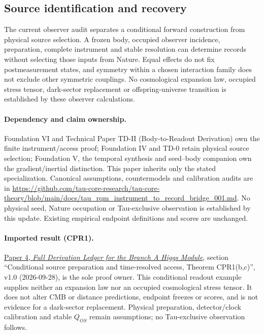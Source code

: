 \documentclass[11pt]{article}
\begin{document}
\subsection{Source identification and recovery}
The current observer audit separates a conditional forward construction from physical source selection. A frozen body, occupied observer incidence, preparation, complete instrument and stable resolution can determine records without selecting those inputs from Nature. Equal effects do not fix postmeasurement states, and symmetry within a chosen interaction family does not exclude other symmetric couplings. No cosmological expansion law, occupied stress tensor, dark-sector replacement or offspring-universe transition is established by these observer calculations.

\paragraph{Dependency and claim ownership.}
Foundation VI and Technical Paper TD-II (Body-to-Readout Derivation) own the finite instrument/access proof; Foundation IV and TD-0 retain physical source selection; Foundation V, the temporal synthesis and seed--body companion own the gradient/inertial distinction. This paper inherits only the stated specialization. Canonical assumptions, countermodels and calibration audits are in \url{https://github.com/tau-core-research/tau-core-theory/blob/main/docs/tau_rqm_instrument_to_record_bridge_001.md}. No physical seed, Nature occupation or Tau-exclusive observation is established by this update. Existing empirical endpoint definitions and scores are unchanged.

\paragraph{Imported result (CPR1).}
\href{https://github.com/tau-core-research/tau-core-higgs-module-paper4/blob/main/paper4_full_derivation/full_derivation.pdf#nameddest=cpr1}{Paper 4, \emph{Full Derivation Ledger for the Branch A Higgs Module}}, section ``Conditional source preparation and time-resolved access, Theorem CPR1(b,c)'', v1.0 (2026-09-28), is the sole proof owner.
This conditional readout example supplies neither an expansion law nor an occupied cosmological stress tensor. It does not alter CMB or distance predictions, endpoint freezes or scores, and is not evidence for a dark-sector replacement.
Physical preparation, detector/clock calibration and stable $Q_{OS}$ remain assumptions; no Tau-exclusive observation follows.
\end{document}
